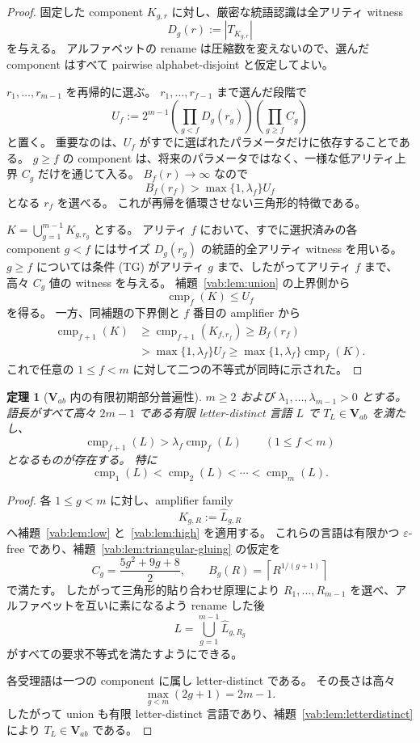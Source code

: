 \documentclass[10pt,a4paper]{ltjsarticle}
\newtheorem{theorem}{定理}[section]
\theoremstyle{definition}
\theoremstyle{remark}
\newcommand{\cmp}{\operatorname{cmp}}
\begin{document}
\begin{proof}
固定した component $K_{g,r}$ に対し、厳密な統語認識は全アリティ witness
\[
D_g(r):=|T_{K_{g,r}}|
\]
を与える。
アルファベットの rename は圧縮数を変えないので、選んだ component はすべて pairwise alphabet-disjoint と仮定してよい。

$r_1,\ldots,r_{m-1}$ を再帰的に選ぶ。
$r_1,\ldots,r_{f-1}$ まで選んだ段階で
\[
U_f
:=2^{m-1}
\left(\prod_{g<f}D_g(r_g)\right)
\left(\prod_{g\ge f}C_g\right)
\]
と置く。
重要なのは、$U_f$ がすでに選ばれたパラメータだけに依存することである。
$g\ge f$ の component は、将来のパラメータではなく、一様な低アリティ上界 $C_g$ だけを通じて入る。
$B_f(r)\to\infty$ なので
\[
B_f(r_f)>\max\{1,\lambda_f\}U_f
\]
となる $r_f$ を選べる。
これが再帰を循環させない三角形的特徴である。

$K=\bigcup_{g=1}^{m-1}K_{g,r_g}$ とする。
アリティ $f$ において、すでに選択済みの各 component $g<f$ にはサイズ $D_g(r_g)$ の統語的全アリティ witness を用いる。
$g\ge f$ については条件 \textup{(TG)} がアリティ $g$ まで、したがってアリティ $f$ まで、高々 $C_g$ 値の witness を与える。
補題~\ref{vab:lem:union} の上界側から
\[
\cmp_f(K)\le U_f
\]
を得る。
一方、同補題の下界側と $f$ 番目の amplifier から
\[
\begin{aligned}
\cmp_{f+1}(K)
&\ge\cmp_{f+1}(K_{f,r_f})
\ge B_f(r_f)\\
&>\max\{1,\lambda_f\}U_f
\ge\max\{1,\lambda_f\}\cmp_f(K).
\end{aligned}
\]
これで任意の $1\le f<m$ に対して二つの不等式が同時に示された。
\end{proof}

\begin{theorem}[$\mathbf V_{ab}$ 内の有限初期部分普遍性]
\label{vab:thm:finite-prefix}
$m\ge2$ および $\lambda_1,\ldots,\lambda_{m-1}>0$ とする。
語長がすべて高々 $2m-1$ である有限 letter-distinct 言語 $L$ で
$T_L\in\mathbf V_{ab}$
を満たし、
\[
\cmp_{f+1}(L)>\lambda_f\cmp_f(L)
\qquad(1\le f<m)
\]
となるものが存在する。
特に
\[
\cmp_1(L)<\cmp_2(L)<\cdots<\cmp_m(L).
\]
\end{theorem}

\begin{proof}
各 $1\le g<m$ に対し、amplifier family
\[
K_{g,R}:=\widehat L_{g,R}
\]
へ補題~\ref{vab:lem:low} と~\ref{vab:lem:high} を適用する。
これらの言語は有限かつ $\varepsilon$-free であり、補題~\ref{vab:lem:triangular-gluing} の仮定を
\[
C_g=\frac{5g^2+9g+8}{2},
\qquad
B_g(R)=\left\lceil R^{1/(g+1)}\right\rceil
\]
で満たす。
したがって三角形的貼り合わせ原理により $R_1,\ldots,R_{m-1}$ を選べ、アルファベットを互いに素になるよう rename した後
\[
L=\bigcup_{g=1}^{m-1}\widehat L_{g,R_g}
\]
がすべての要求不等式を満たすようにできる。

各受理語は一つの component に属し letter-distinct である。
その長さは高々
\[
\max_{g<m}(2g+1)=2m-1.
\]
したがって union も有限 letter-distinct 言語であり、補題~\ref{vab:lem:letterdistinct} により
$T_L\in\mathbf V_{ab}$
である。
\end{proof}
\end{document}
